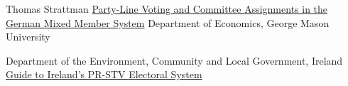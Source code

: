 \begin{thebibliography}{99}
Thomas Strattman
{\color{blue} \href{https://www.researchgate.net/profile/Thomas_Stratmann2/publication/228978716_Party-Line_Voting_and_Committee_Assignments_in_the_German_Mixed_Member_System/links/0c96052d411ad2b0ae000000/Party-Line-Voting-and-Committee-Assignments-in-the-German-Mixed-Member-System.pdf}{Party-Line Voting and Committee Assignments in the German Mixed Member System}}
Department of Economics, George Mason University

Department of the Environment, Community and Local Government, Ireland
{\color{blue} \href{https://www.laois.ie/wp-content/uploads/Guide-to-Irelands-Electoral-System-2.pdf}{Guide to Ireland’s PR-STV Electoral System}}

\end{thebibliography}
